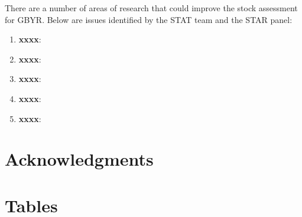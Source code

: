 \documentclass[12pt,]{article}
\begin{document}
There are a number of areas of research that could improve the stock
assessment for GBYR. Below are issues identified by the STAT team and
the STAR panel:

\begin{enumerate}

\item \textbf{xxxx}: 

\item \textbf{xxxx}:

\item \textbf{xxxx}:

\item \textbf{xxxx}:

\item \textbf{xxxx}:

\end{enumerate}

\section{Acknowledgments}\label{acknowledgments}

\newpage

\FloatBarrier

\section{Tables}\label{tables}

\FloatBarrier
\end{document}
